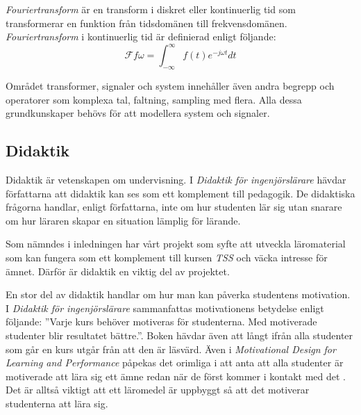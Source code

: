 \documentclass[12pt,a4paper,twoside,openright]{article}
\begin{document}
\textit{Fouriertransform} är en transform i diskret eller
kontinuerlig tid som transformerar en funktion från tidsdomänen till
frekvensdomänen. \textit{Fouriertransform} i kontinuerlig tid är
definierad enligt följande:
\[\mathcal{F} f \omega = \int_{-\infty}^{\infty} f(t) e^{-j \omega t} dt\]






Området transformer, signaler och system innehåller även andra begrepp
och operatorer som komplexa tal, faltning, sampling med flera. Alla
dessa grundkunskaper behövs för att modellera system och signaler.

\subsection{Didaktik}
\label{sec:didaktik}
Didaktik är vetenskapen om undervisning. I \textit{Didaktik för
 ingenjörslärare}\cite{didaktik_for_ingenjorslarare} hävdar författarna att didaktik kan ses som ett
komplement till pedagogik. De didaktiska frågorna handlar, enligt
författarna, inte om hur studenten lär sig utan snarare om hur läraren
skapar en situation lämplig för lärande.

Som nämndes i inledningen har vårt projekt
 som syfte att utveckla läromaterial som kan fungera som ett
komplement till kursen \textit{TSS} och väcka intresse för ämnet.
Därför är didaktik en viktig del av projektet.

En stor del av didaktik handlar om hur man kan påverka studentens
motivation. I \textit{Didaktik för ingenjörslärare} sammanfattas
motivationens betydelse enligt följande: ”Varje kurs behöver motiveras
för studenterna. Med motiverade studenter blir resultatet bättre.”.
Boken hävdar även att långt ifrån alla studenter som går en kurs utgår
från att den är läsvärd. Även i \textit{Motivational Design for
 Learning and Performance} påpekas det orimliga i att anta att alla
studenter är motiverade att lära sig ett ämne redan när de först
kommer i kontakt med det \cite{motivational_design}. Det är alltså viktigt att ett läromedel är
uppbyggt så att det motiverar studenterna att lära sig.
\end{document}
